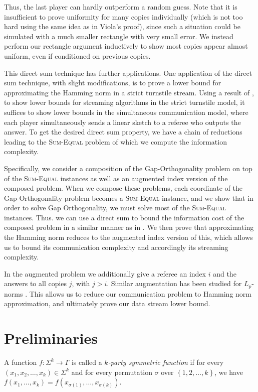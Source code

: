\documentclass[11pt]{article}
\numberwithin{equation}{section}
\theoremstyle{definition}
\theoremstyle{plain}
\newcommand{\set}[1]{{\left \{{#1} \right \}}}
\newcommand{\alphabet}{\ensuremath{\Sigma}}
\newcommand{\range}{\ensuremath{\Gamma}}
\newcommand{\sumequal}{\textsc{Sum-Equal} }
\begin{document}
Thus, the last player can hardly outperform a random guess. 
Note that it is insufficient to prove uniformity for many copies individually 
(which is not too hard using the same idea as in Viola's proof), 
since such a situation could be simulated with a much smaller rectangle 
with very small error.
We instead perform our rectangle argument inductively to show most 
copies appear almost uniform, even if conditioned on previous copies. 


This direct sum technique has further applications. One application {\color{black} of the direct sum technique, with slight modifications,}
is to prove a lower bound for approximating the Hamming norm 
in a strict turnstile stream. 
Using a result of \cite{AHLW16}, to show lower bounds for streaming algorithms in the
strict turnstile model, it suffices to show lower bounds in the simultaneous communication model, where each player simultaneously sends a linear sketch to a referee who outputs the answer. 
To get the desired direct sum property, we have a chain of reductions leading to the \sumequal problem
%
of which we compute the information complexity.  %

Specifically, we consider a composition of the Gap-Orthogonality problem on top of the \sumequal instances as well as an augmented index version of the composed problem. When we compose these problems, each coordinate of the Gap-Orthogonality problem becomes a \sumequal instance, and we show that in order to solve Gap Orthogonality, we must solve most of the \sumequal instances. Thus. we can use a direct sum to bound the information cost of the composed problem in a similar manner as in \cite{wz12}. We then prove that approximating the Hamming norm reduces to the augmented index version of this, which allows us to bound its communication complexity and accordingly its streaming complexity.

In the augmented problem 
we additionally give a referee an index $i$ and the answers to all copies $j$, with $j > i$. 
Similar augmentation has been studied for $L_p$-norms \cite{knw10b}. 
This allows us to reduce our communication problem to Hamming norm approximation, and ultimately prove our data stream lower bound. 


%
%
\section{Preliminaries}
\label{sec:pre}


A function $f:\alphabet^k \to \range$ is called a \emph{$k$-party symmetric function} if for every $(x_1,x_2,\dots,x_k)\in \alphabet^k$ and for every permutation $\sigma$ over $\set{1,2,\dots,k}$,
we have 
$f(x_1,\dots,x_k) = f\left(x_{\sigma(1)},  \dots, x_{\sigma(k)}\right).$
\end{document}
